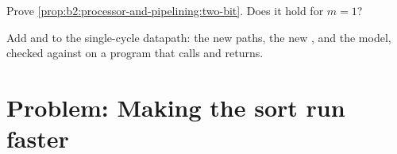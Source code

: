 \begin{exercise}[$\star\star\star$]\label{exo:b2:processor-and-pipelining:11}
Prove \cref{prop:b2:processor-and-pipelining:two-bit}. Does it hold for $m = 1$?
\end{exercise}

\begin{exercise}[$\star\star\star$]\label{exo:b2:processor-and-pipelining:12}
Add  and  to the single-cycle datapath: the new paths, the new , and the model,
checked against  on a program that calls and returns.
\end{exercise}

\section{Problem: Making the sort run faster}\label{sec:b2:processor-and-pipelining:problem}

